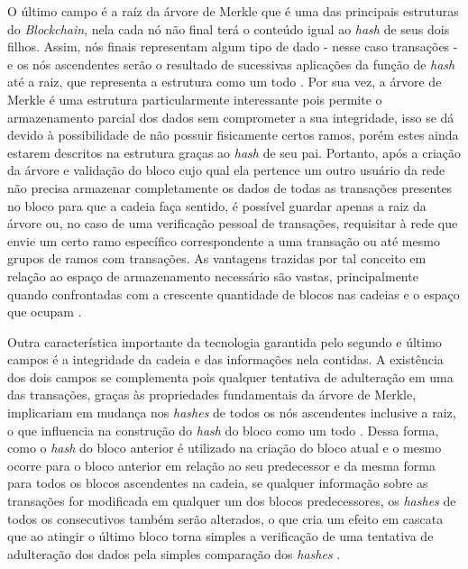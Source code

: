 %
O último campo é a raíz da árvore de Merkle que é uma das principais estruturas do \textit{Blockchain}, nela cada nó não final terá o conteúdo igual ao \textit{hash} de seus dois filhos. Assim, nós finais representam algum tipo de dado - nesse caso transações - e os nós ascendentes serão o resultado de sucessivas aplicações da função de \textit{hash} até a raiz, que representa a estrutura como um todo \cite{blockchain:capitulo5}.
%
Por sua vez, a árvore de Merkle é uma estrutura particularmente interessante pois permite o armazenamento parcial dos dados sem comprometer a sua integridade, isso se dá devido à possibilidade de não possuir fisicamente certos ramos, porém estes ainda estarem descritos na estrutura graças ao \textit{hash} de seu pai. Portanto, após a criação da árvore e validação do bloco cujo qual ela pertence um outro usuário da rede não precisa armazenar completamente os dados de todas as transações presentes no bloco para que a cadeia faça sentido, é possível guardar apenas a raiz da árvore ou, no caso de uma verificação pessoal de transações, requisitar à rede que envie um certo ramo específico correspondente a uma transação ou até mesmo grupos de ramos com transações. As vantagens trazidas por tal conceito em relação ao espaço de armazenamento necessário são vastas, principalmente quando confrontadas com a crescente quantidade de blocos nas cadeias e o espaço que ocupam \cite{blockchain:seguranca_desafios, blockchain:bitcoin_whitepaper}.

%
Outra característica importante da tecnologia garantida pelo segundo e último campos é a integridade da cadeia e das informações nela contidas. A existência dos dois campos se complementa pois qualquer tentativa de adulteração em uma das transações, graças às propriedades fundamentais da árvore de Merkle, implicariam em mudança nos \textit{hashes} de todos os nós ascendentes inclusive a raiz, o que influencia na construção do \textit{hash} do bloco como um todo \cite{blockchain:arvore_merkle}.
%
Dessa forma, como o \textit{hash} do bloco anterior é utilizado na criação do bloco atual e o mesmo ocorre para o bloco anterior em relação ao seu predecessor e da mesma forma para todos os blocos ascendentes na cadeia, se qualquer informação sobre as transações for modificada em qualquer um dos blocos predecessores, os \textit{hashes} de todos os consecutivos também serão alterados, o que cria um efeito em cascata que ao atingir o último bloco torna simples a verificação de uma tentativa de adulteração dos dados pela simples comparação dos \textit{hashes} \cite{blockchain:bitcoin_whitepaper}.


